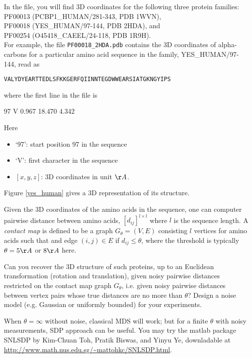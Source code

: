 \documentclass[11pt]{article}
\begin{document}
\noindent In the file, you will find 3D coordinates for the following three protein families: 
\subitem PF00013 (PCBP1\_HUMAN/281-343, PDB 1WVN), \\
\subitem PF00018 (YES\_HUMAN/97-144, PDB 2HDA), and \\
\subitem PF00254 (O45418\_CAEEL/24-118, PDB 1R9H). \\

For example, the file {\tt PF00018\_2HDA.pdb} contains the 3D coordinates of alpha-carbons for a particular amino acid sequence in the family, YES\_HUMAN/97-144, read as

{\tt{VALYDYEARTTEDLSFKKGERFQIINNTEGDWWEARSIATGKNGYIPS}}

\noindent where the first line in the file is 

97	V	0.967	18.470	4.342

\noindent Here
\begin{itemize}
\item `97': start position 97 in the sequence
\item `V': first character in the sequence
\item $[x,y,z]$: 3D coordinates in unit $\AA$.
\end{itemize}

\noindent Figure \ref{yes_human} gives a 3D representation of its structure. 


Given the 3D coordinates of the amino acids in the sequence, one can computer pairwise distance between amino acids, $[d_{ij}]^{l\times l}$ where $l$ is the sequence length. A \emph{contact map} is defined to be a graph $G_\theta=(V,E)$ consisting $l$ vertices for amino acids such that and edge $(i,j)\in E$ if $d_{ij} \leq \theta$, where the threshold is typically $\theta=5\AA$ or $8\AA$ here. 

Can you recover the 3D structure of such proteins, up to an Euclidean transformation (rotation and translation), given noisy pairwise distances restricted on the contact map graph $G_\theta$, i.e. given noisy pairwise distances between vertex pairs whose true distances are no more than $\theta$? Design a noise model (e.g. Gaussian or uniformly bounded) for your experiments. 

When $\theta=\infty$ without noise, classical MDS will work; but for a finite $\theta$ with noisy measurements, SDP approach can be useful. You may try the matlab package SNLSDP by Kim-Chuan Toh, Pratik Biswas, and Yinyu Ye, downladable at \url{http://www.math.nus.edu.sg/~mattohkc/SNLSDP.html}. 
\end{document}
